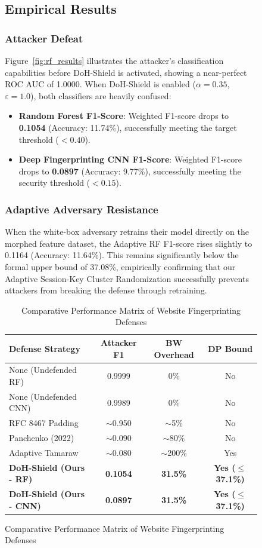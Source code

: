 \documentclass[10pt,journal,compsoc,twocolumn]{IEEEtran}
\begin{document}
\begin{figure}[t]
\subsection{Empirical Results}

\subsubsection{Attacker Defeat}
Figure~\ref{fig:rf_results} illustrates the attacker's classification capabilities before DoH-Shield is activated, showing a near-perfect ROC AUC of 1.0000. When DoH-Shield is enabled ($\alpha = 0.35$, $\varepsilon = 1.0$), both classifiers are heavily confused:
\begin{itemize}
    \item \textbf{Random Forest F1-Score}: Weighted F1-score drops to \textbf{0.1054} (Accuracy: 11.74\%), successfully meeting the target threshold ($< 0.40$).
    \item \textbf{Deep Fingerprinting CNN F1-Score}: Weighted F1-score drops to \textbf{0.0897} (Accuracy: 9.77\%), successfully meeting the security threshold ($< 0.15$).
\end{itemize}

\subsubsection{Adaptive Adversary Resistance}
When the white-box adversary retrains their model directly on the morphed feature dataset, the Adaptive RF F1-score rises slightly to 0.1164 (Accuracy: 11.64\%). This remains significantly below the formal upper bound of 37.08\%, empirically confirming that our Adaptive Session-Key Cluster Randomization successfully prevents attackers from breaking the defense through retraining.

\begin{table}[h]
\centering
\caption{Comparative Performance Matrix of Website Fingerprinting Defenses}
\label{tab:comparison}
\begin{tabular}{lccc}
\toprule
\textbf{Defense Strategy} & \textbf{Attacker F1} & \textbf{BW Overhead} & \textbf{DP Bound} \\
\midrule
None (Undefended RF) & 0.9999 & 0\% & No \\
None (Undefended CNN) & 0.9989 & 0\% & No \\
RFC 8467 Padding & $\sim$0.950 & $\sim$5\% & No \\
Panchenko (2022) \cite{panchenko2022} & $\sim$0.090 & $\sim$80\% & No \\
Adaptive Tamaraw \cite{tamaraw} & $\sim$0.080 & $\sim$200\% & Yes \\
\midrule
\textbf{DoH-Shield (Ours - RF)} & \textbf{0.1054} & \textbf{31.5\%} & \textbf{Yes ($\le$37.1\%)} \\
\textbf{DoH-Shield (Ours - CNN)} & \textbf{0.0897} & \textbf{31.5\%} & \textbf{Yes ($\le$37.1\%)} \\
\bottomrule
\end{tabular}
\end{table}


\end{figure}
\end{document}
